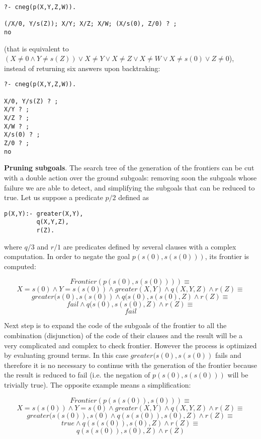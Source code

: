 \documentclass{llncs}
\begin{document}
\begin{verbatim}
?- cneg(p(X,Y,Z,W)).

(/X/0, Y/s(Z)); X/Y; X/Z; X/W; (X/s(0), Z/0) ? ;
no
\end{verbatim}

\noindent
(that is equivalent to $ (X \neq 0 \wedge Y\neq s(Z)) \vee X \neq Y
\vee X \neq Z \vee X \neq W \vee X \neq s(0) \vee Z \neq 0$),
instead of returning six answers upon backtraking:
\begin{verbatim}
?- cneg(p(X,Y,Z,W)).

X/0, Y/s(Z) ? ;
X/Y ? ;
X/Z ? ;
X/W ? ;
X/s(0) ? ;
Z/0 ? ;
no
\end{verbatim}


\noindent
{\bf Pruning subgoals}. The search tree of the generation of the
frontiers can be cut with a double action over the ground subgoals:
removing soon the subgoals whose failure we are able to detect, and
simplifying the subgoals that can be reduced to true. Let us suppose a
predicate $p/2$ defined as
\begin{verbatim}
p(X,Y):- greater(X,Y),
         q(X,Y,Z),
         r(Z).
\end{verbatim}
\noindent
where $q/3$ and $r/1$ are predicates defined by several
clauses with a complex computation. In order to negate
the goal $p(s(0),s(s(0)))$, its frontier is computed:

$$Frontier(p(s(0),s(s(0)))) \equiv $$
$${ X=s(0) \wedge Y=s(s(0)) \wedge
  greater(X,Y) \wedge q(X,Y,Z) \wedge r(Z) } \equiv $$
$${ greater(s(0),s(s(0)) \wedge q(s(0),s(s(0),Z) \wedge r(Z) } \equiv $$
$${ fail  \wedge q(s(0),s(s(0),Z) \wedge r(Z) } \equiv $$
$$fail $$

Next step is to expand the code of the subgoals of the frontier to all
the combination (disjunction) of the code of their clauses and the
result will be a very complicated and complex to check frontier.
However the process is optimized by evaluating ground terms. In this
case $greater(s(0),s(s(0))$ fails and therefore it is no necessary to
continue with the generation of the frontier because the result is
reduced to fail (i.e. the negation of $p (s(0), s(s(0)))$ will be
trivially true). The opposite example means a simplification:

$$Frontier(p(s(s(0)),s(0))) \equiv $$
$${ X=s(s(0)) \wedge Y=s(0) \wedge greater(X,Y) \wedge q(X,Y,Z) \wedge
  r(Z) } \equiv $$
$${ greater(s(s(0)),s(0) \wedge q(s(s(0)),s(0),Z) \wedge r(Z) } \equiv
$$
$${ true \wedge q(s(s(0)),s(0),Z) \wedge r(Z) } \equiv $$
$${ q(s(s(0)),s(0),Z) \wedge r(Z) } $$
\end{document}
